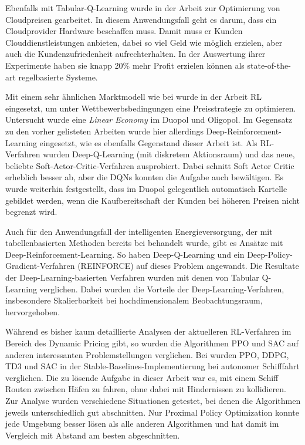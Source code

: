 Ebenfalls mit Tabular-Q-Learning wurde in der Arbeit \cite{9086147} zur Optimierung von Cloudpreisen gearbeitet.
In diesem Anwendungsfall geht es darum, dass ein Cloudprovider Hardware beschaffen muss.
Damit muss er Kunden Clouddienstleistungen anbieten, dabei so viel Geld wie möglich erzielen, aber auch die Kundenzufriedenheit aufrechterhalten.
In der Auswertung ihrer Experimente haben sie knapp 20\% mehr Profit erzielen können als state-of-the-art regelbasierte Systeme.

Mit einem sehr ähnlichen Marktmodell wie bei \cite{10.1145/3219819.3219833} wurde in der Arbeit \cite{Kastius2022} RL eingesetzt, um unter Wettbewerbsbedingungen eine Preisstrategie zu optimieren.
Untersucht wurde eine \textit{Linear Economy} im Duopol und Oligopol.
Im Gegensatz zu den vorher gelisteten Arbeiten wurde hier allerdings Deep-Reinforcement-Learning eingesetzt, wie es ebenfalls Gegenstand dieser Arbeit ist.
Als RL-Verfahren wurden Deep-Q-Learning (mit diskretem Aktionsraum) und das neue, beliebte Soft-Actor-Critic-Verfahren ausprobiert.
Dabei schnitt Soft Actor Critic erheblich besser ab, aber die DQNs konnten die Aufgabe auch bewältigen.
Es wurde weiterhin festgestellt, dass im Duopol gelegentlich automatisch Kartelle gebildet werden, wenn die Kaufbereitschaft der Kunden bei höheren Preisen nicht begrenzt wird.

Auch für den Anwendungsfall der intelligenten Energieversorgung, der mit tabellenbasierten Methoden bereits bei \cite{Kim2016DynamicPA} behandelt wurde, gibt es Ansätze mit Deep-Reinforcement-Learning.
So haben \cite{8356086} Deep-Q-Learning und ein Deep-Policy-Gradient-Verfahren (REINFORCE) auf dieses Problem angewandt.
Die Resultate der Deep-Learning-basierten Verfahren wurden mit denen von Tabular Q-Learning verglichen.
Dabei wurden die Vorteile der Deep-Learning-Verfahren, insbesondere Skalierbarkeit bei hochdimensionalem Beobachtungsraum, hervorgehoben.

Während es bisher kaum detaillierte Analysen der aktuelleren RL-Verfahren im Bereich des Dynamic Pricing gibt, so wurden die Algorithmen PPO und SAC auf anderen interessanten Problemstellungen verglichen.
Bei \cite{LarsenVessel} wurden PPO, DDPG, TD3 und SAC in der Stable-Baselines-Implementierung bei autonomer Schifffahrt verglichen.
Die zu lösende Aufgabe in dieser Arbeit war es, mit einem Schiff Routen zwischen Häfen zu fahren, ohne dabei mit Hindernissen zu kollidieren.
Zur Analyse wurden verschiedene Situationen getestet, bei denen die Algorithmen jeweils unterschiedlich gut abschnitten.
Nur Proximal Policy Optimization konnte jede Umgebung besser lösen als alle anderen Algorithmen und hat damit im Vergleich mit Abstand am besten abgeschnitten.

